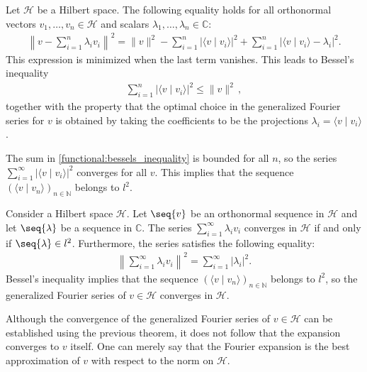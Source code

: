     \begin{property}
        Let $\mathcal{H}$ be a Hilbert space. The following equality holds for all orthonormal vectors $v_1,\ldots,v_n\in\mathcal{H}$ and scalars $\lambda_1,\ldots,\lambda_n\in\mathbb{C}$:
        \begin{gather}
            \left\|v - \sum_{i=1}^n\lambda_iv_i\right\|^2 = \|v\|^2 - \sum_{i=1}^n|\langle v\mid v_i \rangle|^2 + \sum_{i=1}^n|\langle v\mid v_i \rangle - \lambda_i|^2.
        \end{gather}
        This expression is minimized when the last term vanishes. This leads to Bessel's inequality
        \begin{gather}
            \label{functional:bessels_inequality}
            \sum_{i=1}^n|\langle v\mid v_i \rangle|^2\leq\|v\|^2\,,
        \end{gather}
        together with the property that the optimal choice in the generalized Fourier series for $v$ is obtained by taking the coefficients to be the projections $\lambda_i=\langle v\mid v_i \rangle$.
    \end{property}
    \begin{result}
        The sum in \eqref{functional:bessels_inequality} is bounded for all $n$, so the series $\sum_{i=1}^\infty|\langle v\mid v_i \rangle|^2$ converges for all $v$. This implies that the sequence $(\langle v\mid v_n\rangle)_{n\in\mathbb{N}}$ belongs to $l^2$.
    \end{result}

    \begin{theorem}
        Consider a Hilbert space $\mathcal{H}$. Let $\seq{v}$ be an orthonormal sequence in $\mathcal{H}$ and let $\seq{\lambda}$ be a sequence in $\mathbb{C}$. The series $\sum_{i=1}^\infty\lambda_iv_i$ converges in $\mathcal{H}$ if and only if $\seq{\lambda}\in l^2$. Furthermore, the series satisfies the following equality:
        \begin{gather}
            \left\|\sum_{i=1}^\infty\lambda_iv_i\right\|^2 = \sum_{i=1}^\infty|\lambda_i|^2.
        \end{gather}
        Bessel's inequality implies that the sequence $(\langle v\mid v_n \rangle)_{n\in\mathbb{N}}$ belongs to $l^2$, so the generalized Fourier series of $v\in\mathcal{H}$ converges in $\mathcal{H}$.
    \end{theorem}
    \begin{remark}
        Although the convergence of the generalized Fourier series of $v\in\mathcal{H}$ can be established using the previous theorem, it does not follow that the expansion converges to $v$ itself. One can merely say that the Fourier expansion is the best approximation of $v$ with respect to the norm on $\mathcal{H}$.
    \end{remark}

